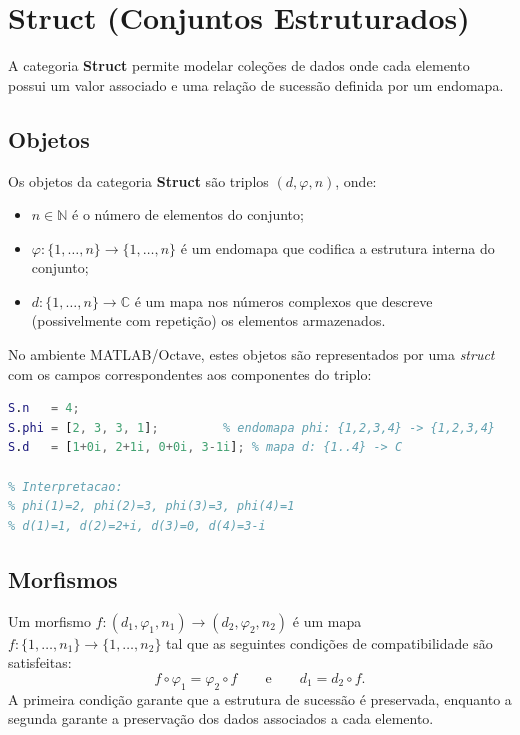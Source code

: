\section{Struct (Conjuntos Estruturados)}
\label{sec:modeling-struct}

A categoria \textbf{Struct} permite modelar coleções de dados onde cada elemento possui um valor associado e uma relação de sucessão definida por um endomapa. 

\subsection{Objetos}
Os objetos da categoria \textbf{Struct} são triplos $(d, \varphi, n)$, onde:
\begin{itemize}
    \item $n \in \mathbb{N}$ é o número de elementos do conjunto;
    \item $\varphi: \{1, \dots, n\} \to \{1, \dots, n\}$ é um endomapa que codifica a estrutura interna do conjunto;
    \item $d: \{1, \dots, n\} \to \mathbb{C}$ é um mapa nos números complexos que descreve (possivelmente com repetição) os elementos armazenados.
\end{itemize}

No ambiente MATLAB/Octave, estes objetos são representados por uma \textit{struct} com os campos correspondentes aos componentes do triplo:

\begin{lstlisting}[language=Matlab, caption={Representação de um objeto de Struct}]
% Objeto S = (d, phi, n)
S.n   = 4;
S.phi = [2, 3, 3, 1];         % endomapa phi: {1,2,3,4} -> {1,2,3,4}
S.d   = [1+0i, 2+1i, 0+0i, 3-1i]; % mapa d: {1..4} -> C

% Interpretacao: 
% phi(1)=2, phi(2)=3, phi(3)=3, phi(4)=1
% d(1)=1, d(2)=2+i, d(3)=0, d(4)=3-i
\end{lstlisting}

\subsection{Morfismos}
Um morfismo $f: (d_1, \varphi_1, n_1) \to (d_2, \varphi_2, n_2)$ é um mapa $f: \{1, \dots, n_1\} \to \{1, \dots, n_2\}$ tal que as seguintes condições de compatibilidade são satisfeitas:
\[
    f \circ \varphi_1 = \varphi_2 \circ f \qquad \text{e} \qquad d_1 = d_2 \circ f.
\]
A primeira condição garante que a estrutura de sucessão é preservada, enquanto a segunda garante a preservação dos dados associados a cada elemento.

